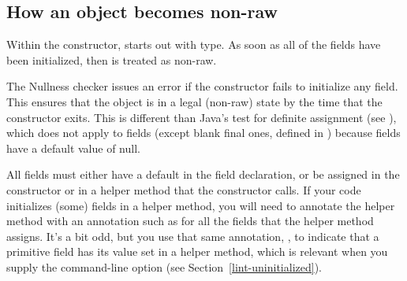 

\subsection{How an object becomes non-raw\label{becoming-non-raw}}

Within the constructor,
 starts out with  type.
As soon as all of the  fields
have been initialized, then  is treated as non-raw.

The Nullness checker issues an error if the constructor fails to initialize
any  field.  This ensures that the object is in a legal (non-raw)
state by the time that the constructor exits.
This is different than Java's test for definite assignment (see
),
which does not apply to fields (except blank final ones, defined in
) because fields
have a default value of null.



All  fields must either have a
default in the field declaration, or be assigned in the constructor or in a
helper method that the constructor calls.  If
your code initializes (some) fields in a helper method, you will need to
annotate the helper method with an annotation such as
for all the fields that the helper method assigns.
It's a bit odd, but you use that same annotation, ,
to indicate that a primitive field has its value set in a helper method,
which is relevant when you supply the 
command-line option (see Section~\ref{lint-uninitialized}).

